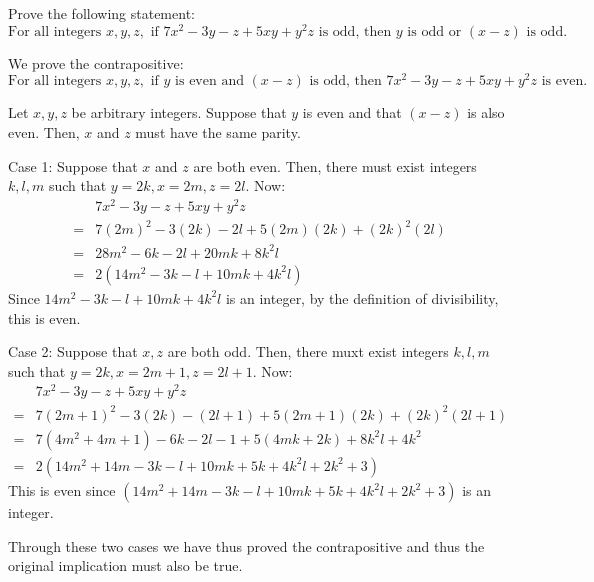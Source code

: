 \documentclass{mlatext}
\begin{document}
\begin{qst}
  Prove the following statement:
  \begin{equation}
    \text{For all integers } x, y, z, \text{ if } 7x^2 - 3y - z + 5xy + y^2z \text{ is odd, then } y \text{ is odd or } (x - z) \text{ is odd.}
  \end{equation}

  \begin{sol}
    We prove the contrapositive:
    \begin{equation}
      \text{For all integers } x, y, z, \text{ if } y \text{ is even and } (x - z) \text{ is odd, then } 7x^2 - 3y - z + 5xy + y^2z \text{ is even.}
    \end{equation}

    Let $x, y, z$ be arbitrary integers. Suppose that $y$ is even and that $(x - z)$ is also even. Then, $x$ and $z$ must have the same parity.

    Case 1: Suppose that $x$ and $z$ are both even. Then, there must exist integers $k, l, m$ such that $y = 2k, x = 2m, z = 2l$. Now:
    \begin{align*}
      &7x^2 - 3y - z + 5xy + y^2z\\
      = &7(2m)^2 - 3(2k) - 2l + 5(2m)(2k) + (2k)^2(2l)\\
      = &28m^2 - 6k - 2l + 20mk + 8k^2l\\
      = &2(14m^2 - 3k - l + 10mk + 4k^2l)
    \end{align*}
    Since $14m^2 - 3k - l + 10mk + 4k^2l$ is an integer, by the definition of divisibility, this is even.

    Case 2: Suppose that $x, z$ are both odd. Then, there muxt exist integers $k, l, m$ such that $y = 2k, x = 2m + 1, z = 2l + 1$. Now:
    \begin{align*}
      &7x^2 - 3y - z + 5xy + y^2z\\
      = &7(2m + 1)^2 - 3(2k) - (2l + 1) + 5(2m + 1)(2k) + (2k)^2(2l + 1)\\
      = &7(4m^2 + 4m + 1) - 6k - 2l - 1 + 5(4mk + 2k) + 8k^2l + 4k^2\\
      = &2(14m^2 + 14m - 3k - l + 10mk + 5k + 4k^2l + 2k^2 + 3)
    \end{align*}
    This is even since $(14m^2 + 14m - 3k - l + 10mk + 5k + 4k^2l + 2k^2 + 3)$ is an integer.

    Through these two cases we have thus proved the contrapositive and thus the original implication must also be true.
  \end{sol}
\end{qst}
\end{document}
